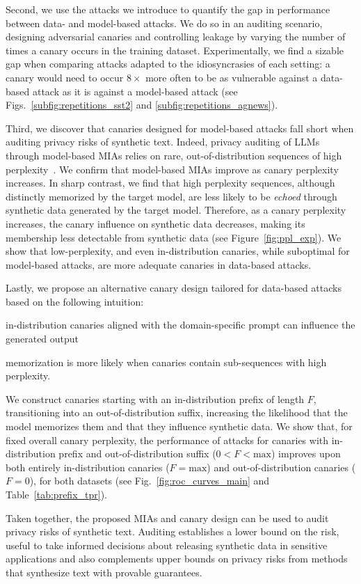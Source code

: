 Second, we use the attacks we introduce to quantify the gap in performance between data- and model-based attacks. We do so in an auditing scenario, designing adversarial canaries and controlling leakage by varying the number of times a canary occurs in the training dataset. Experimentally, we find a sizable gap when comparing attacks adapted to the idiosyncrasies of each setting: a canary would need to occur $8\times$ more often to be as vulnerable against a data-based attack as it is against a model-based attack (see Figs.~\ref{subfig:repetitions_sst2} and \ref{subfig:repetitions_agnews}). 

Third, we discover that canaries designed for model-based attacks fall short when auditing privacy risks of synthetic text. Indeed, privacy auditing of LLMs through model-based MIAs relies on rare, out-of-distribution sequences of high perplexity~\citep{carlini2019secret,stock2022defending,wei2024proving,meeuscopyright}. We confirm that model-based MIAs improve as canary perplexity increases. In sharp contrast, we find that high perplexity sequences, although distinctly memorized by the target model, are less likely to be \emph{echoed} through synthetic data generated by the target model. Therefore, as a canary perplexity increases, the canary influence on synthetic data decreases, making its membership less detectable from synthetic data (see Figure~\ref{fig:ppl_exp}). We show that low-perplexity, and even in-distribution canaries, while suboptimal for model-based attacks, are more adequate canaries in data-based attacks.

Lastly, we propose an alternative canary design tailored for data-based attacks based on the following intuition: 
%
\begin{inlineenum}
\item in-distribution canaries aligned with the domain-specific prompt can influence the generated output 
\item memorization is more likely when canaries contain sub-sequences with high perplexity.
\end{inlineenum}
%
We construct canaries starting with an in-distribution prefix of length $F$, transitioning into an out-of-distribution suffix, increasing the likelihood that the model memorizes them and that they influence synthetic data. 
We show that, for fixed overall canary perplexity, the performance of attacks for canaries with in-distribution prefix and out-of-distribution suffix ($0<F<\text{max}$) improves upon both entirely in-distribution canaries ($F=\text{max}$) and out-of-distribution canaries ($F=0$), for both datasets (see Fig.~\ref{fig:roc_curves_main} and Table~\ref{tab:prefix_tpr}). 

Taken together, the proposed MIAs and canary design can be used to audit privacy risks of synthetic text. Auditing establishes a lower bound on the risk, useful to take informed decisions about releasing synthetic data in sensitive applications and also complements upper bounds on privacy risks from methods that synthesize text with provable guarantees.


